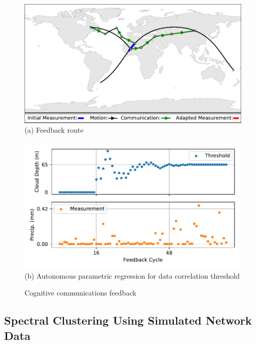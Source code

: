 \documentclass[conference]{IEEEtran}
\begin{document}
\begin{figure}[t!]
  \begin{minipage}[b]{\linewidth}
    \begin{center}
      \includegraphics[width=\textwidth]{images/loop.pdf}
      {\footnotesize(a) Feedback route}
    \end{center}
    \medskip
  \end{minipage}
  \begin{minipage}[b]{\linewidth}
    \begin{center}
      \includegraphics[width=\textwidth]{images/regression.pdf}
      {\footnotesize(b) Autonomous parametric regression for data correlation
        threshold}
    \end{center}
  \end{minipage}
  \caption{Cognitive communications feedback}
  \label{fig:feedback}
\end{figure}

\subsection{Spectral Clustering Using Simulated Network Data}
\label{ssec:cluster}
\end{document}
